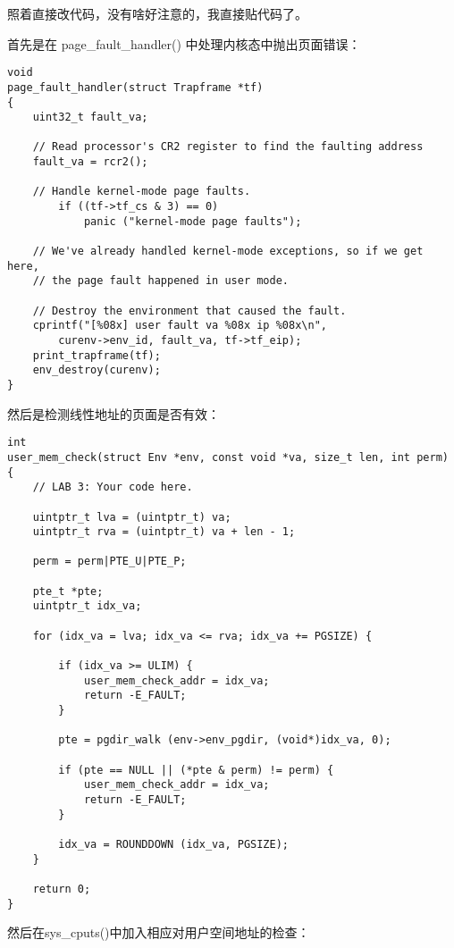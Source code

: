 \documentclass{article}
\newcommand{\funcname}[1]{{\ttfamily \small #1}}
\begin{document}
\begin{CJK*}{UTF8}{gkai}
照着直接改代码，没有啥好注意的，我直接贴代码了。

首先是在 \funcname{ page\_fault\_handler() } 中处理内核态中抛出页面错误：

\begin{lstlisting}[style=ccode, title={\scriptsize \ttfamily \bfseries kern/trap.c: page\_fault\_handler()}]
void
page_fault_handler(struct Trapframe *tf)
{
	uint32_t fault_va;

	// Read processor's CR2 register to find the faulting address
	fault_va = rcr2();

	// Handle kernel-mode page faults.
        if ((tf->tf_cs & 3) == 0)
            panic ("kernel-mode page faults");
 
	// We've already handled kernel-mode exceptions, so if we get here,
	// the page fault happened in user mode.

	// Destroy the environment that caused the fault.
	cprintf("[%08x] user fault va %08x ip %08x\n",
		curenv->env_id, fault_va, tf->tf_eip);
	print_trapframe(tf);
	env_destroy(curenv);
}
\end{lstlisting}

然后是检测线性地址的页面是否有效：

\begin{lstlisting}[style=ccode, title={\scriptsize \ttfamily \bfseries kern/pmap.c: user\_mem\_check()}]
int
user_mem_check(struct Env *env, const void *va, size_t len, int perm)
{
	// LAB 3: Your code here. 
    
    uintptr_t lva = (uintptr_t) va;
    uintptr_t rva = (uintptr_t) va + len - 1;

    perm = perm|PTE_U|PTE_P;

    pte_t *pte;
    uintptr_t idx_va;

    for (idx_va = lva; idx_va <= rva; idx_va += PGSIZE) {

        if (idx_va >= ULIM) {
            user_mem_check_addr = idx_va;
            return -E_FAULT;
        }

        pte = pgdir_walk (env->env_pgdir, (void*)idx_va, 0);

        if (pte == NULL || (*pte & perm) != perm) {  
            user_mem_check_addr = idx_va;
            return -E_FAULT;
        }

        idx_va = ROUNDDOWN (idx_va, PGSIZE);
    }

    return 0;
}
\end{lstlisting}

然后在\funcname{sys\_cputs()}中加入相应对用户空间地址的检查：


\end{CJK*}
\end{document}
